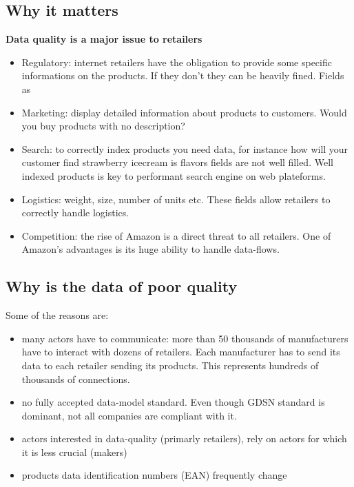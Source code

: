 \subsection{Why it matters}

\textbf{Data quality is a major issue to retailers}

\begin{itemize}
\item Regulatory: internet retailers have the obligation to provide some specific informations on the products. If they don't they can be heavily fined. Fields as 
\item Marketing: display detailed information about products to customers. Would you buy products with no description?
\item Search: to correctly index products you need data, for instance how will your customer find strawberry icecream is flavors fields are not well filled. Well indexed products is key to performant search engine on web plateforms.
\item Logistics: weight, size, number of units etc. These fields allow retailers to correctly handle logistics.
\item Competition: the rise of Amazon is a direct threat to all retailers. One of Amazon's advantages is its huge ability to handle data-flows.
\end{itemize}


\subsection{Why is the data of poor quality}

Some of the reasons are:

\begin{itemize}
\item many actors have to communicate: more than 50 thousands of manufacturers have to interact with dozens of retailers. Each manufacturer has to send its data to each retailer sending its products. This represents hundreds of thousands of connections.
\item no fully accepted data-model standard. Even though GDSN standard is dominant, not all companies are compliant with it.
\item actors interested in data-quality (primarly retailers), rely on actors for which it is less crucial (makers)
\item products data identification numbers (EAN) frequently change
\end{itemize}

